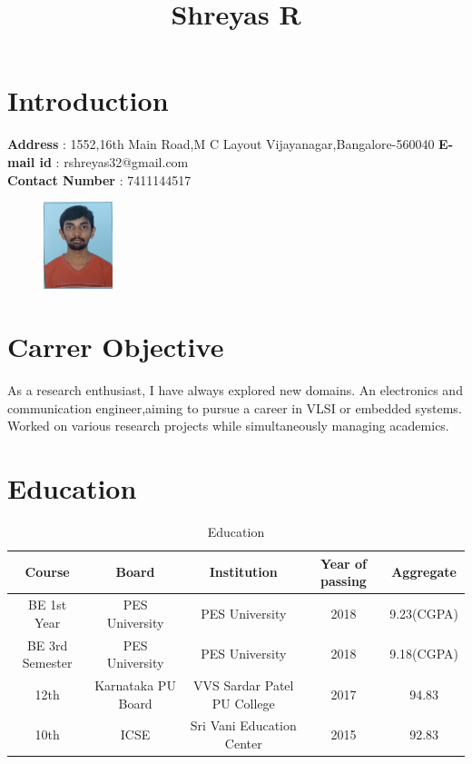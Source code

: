 \documentclass{article}
\title{\textbf{Shreyas R}}
\date{\vspace{-5ex}}
\begin{document}
	\maketitle
	\hrulefill
	
	\section{Introduction}
	\begin{flushleft}
		\textbf{Address} : 1552,16th Main Road,M C Layout
		Vijayanagar,Bangalore-560040
		\textbf{E-mail id} : rshreyas32@gmail.com
		\\\textbf{Contact Number} : 7411144517
		\begin{figure}[!ht]
			\begin{flushright}
				\includegraphics[width=20mm]{image.jpeg}
			\end{flushright}
		\end{figure}
	\end{flushleft}

	\section{Carrer Objective}
	As a research enthusiast, I have always explored new domains. An electronics and communication engineer,aiming to pursue a career in VLSI or embedded systems. Worked on various research projects while simultaneously managing academics.
	
	\section{Education}
	\begin{table}[ht]
		\caption{Education}
		\centering
		\begin{tabular}{c c c c c}
			\hline\hline
			Course & Board & Institution & Year of passing & Aggregate \\[0.5ex]
			\hline
			BE 1st Year & PES University & PES University & 2018 & 9.23(CGPA) \\
			BE 3rd Semester & PES University & PES University & 2018 & 9.18(CGPA) \\
			12th & Karnataka PU Board & VVS Sardar Patel PU College  & 2017 & 94.83 \\
			10th & ICSE & Sri Vani Education Center & 2015 & 92.83 \\ 
			\hline
		\end{tabular}
		\label{table:nonlin}
	\end{table}
\end{document}
